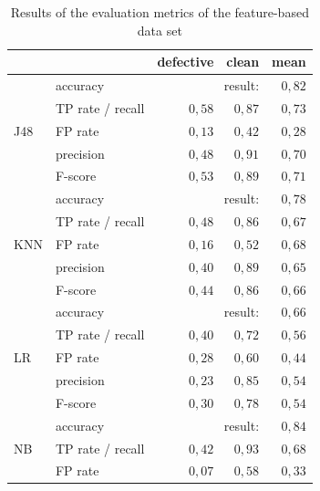 \begin{table}[t]
\centering
\caption{Results of the evaluation metrics of the feature-based data set}
\label{tab:met-results-feat}
\begin{tabular}{@{}llrrr@{}}
\toprule
                     &                  & defective      & clean      & mean   \\ \midrule
\multirow{5}{*}{J48} & accuracy         & \multicolumn{2}{r}{result:} & $0,82$ \\
                     & TP rate / recall & $0,58$         & $0,87$     & $0,73$ \\
                     & FP rate          & $0,13$         & $0,42$     & $0,28$ \\
                     & precision        & $0,48$         & $0,91$     & $0,70$ \\
                     & F-score          & $0,53$         & $0,89$     & $0,71$ \\ \midrule
\multirow{5}{*}{KNN} & accuracy         & \multicolumn{2}{r}{result:} & $0,78$ \\
                     & TP rate / recall & $0,48$         & $0,86$     & $0,67$ \\
                     & FP rate          & $0,16$         & $0,52$     & $0,68$ \\
                     & precision        & $0,40$         & $0,89$     & $0,65$ \\
                     & F-score          & $0,44$         & $0,86$     & $0,66$ \\ \midrule
\multirow{5}{*}{LR}  & accuracy         & \multicolumn{2}{r}{result:} & $0,66$ \\
                     & TP rate / recall & $0,40$         & $0,72$     & $0,56$ \\
                     & FP rate          & $0,28$         & $0,60$     & $0,44$ \\
                     & precision        & $0,23$         & $0,85$     & $0,54$ \\
                     & F-score          & $0,30$         & $0,78$     & $0,54$ \\ \midrule
\multirow{5}{*}{NB}  & accuracy         & \multicolumn{2}{r}{result:} & $0,84$ \\
                     & TP rate / recall & $0,42$         & $0,93$     & $0,68$ \\
                     & FP rate          & $0,07$         & $0,58$     & $0,33$ \\

\end{tabular}
\end{table}
